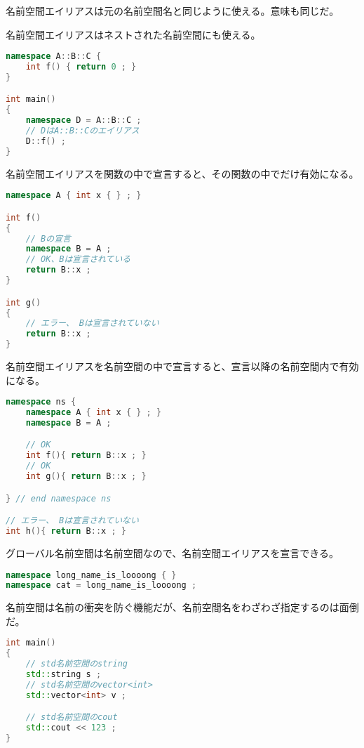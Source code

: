 名前空間エイリアスは元の名前空間名と同じように使える。意味も同じだ。

名前空間エイリアスはネストされた名前空間にも使える。

\begin{lstlisting}[language={C++}]
namespace A::B::C {
    int f() { return 0 ; }
}

int main()
{
    namespace D = A::B::C ;
    // DはA::B::Cのエイリアス
    D::f() ;
}
\end{lstlisting}

名前空間エイリアスを関数の中で宣言すると、その関数の中でだけ有効になる。

\begin{lstlisting}[language={C++}]
namespace A { int x { } ; }

int f()
{
    // Bの宣言
    namespace B = A ;
    // OK、Bは宣言されている
    return B::x ;
}

int g()
{
    // エラー、 Bは宣言されていない
    return B::x ;
}
\end{lstlisting}

名前空間エイリアスを名前空間の中で宣言すると、宣言以降の名前空間内で有効になる。

\begin{lstlisting}[language={C++}]
namespace ns {
    namespace A { int x { } ; }
    namespace B = A ;

    // OK
    int f(){ return B::x ; }
    // OK
    int g(){ return B::x ; }

} // end namespace ns

// エラー、 Bは宣言されていない
int h(){ return B::x ; }
\end{lstlisting}

グローバル名前空間は名前空間なので、名前空間エイリアスを宣言できる。

\begin{lstlisting}[language={C++}]
namespace long_name_is_loooong { }
namespace cat = long_name_is_loooong ;
\end{lstlisting}


名前空間は名前の衝突を防ぐ機能だが、名前空間名をわざわざ指定するのは面倒だ。

\begin{lstlisting}[language={C++}]
int main()
{
    // std名前空間のstring
    std::string s ;
    // std名前空間のvector<int>
    std::vector<int> v ;

    // std名前空間のcout
    std::cout << 123 ;
}
\end{lstlisting}


